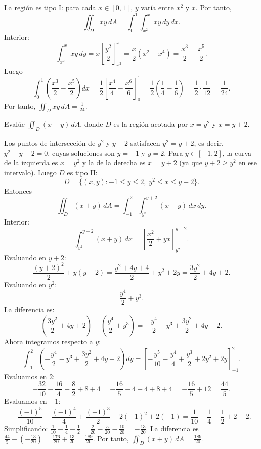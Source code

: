 \begin{myproof}
La región es tipo I: para cada $x\in[0,1]$, $y$ varía entre $x^2$ y $x$. Por tanto,
\[
\iint_D xy\,dA = \int_0^1\int_{x^2}^{x} xy\,dy\,dx.
\]
Interior:
\[
\int_{x^2}^{x} xy\,dy = x\left[\frac{y^2}{2}\right]_{x^2}^{x}
= \frac{x}{2}(x^2-x^4) = \frac{x^3}{2}-\frac{x^5}{2}.
\]
Luego
\[
\int_0^1 \left(\frac{x^3}{2}-\frac{x^5}{2}\right)dx
= \frac{1}{2}\left[\frac{x^4}{4}-\frac{x^6}{6}\right]_0^1
= \frac{1}{2}\left(\frac{1}{4}-\frac{1}{6}\right)
= \frac{1}{2}\cdot\frac{1}{12}=\frac{1}{24}.
\]
Por tanto, $\displaystyle\iint_D xy\,dA = \frac{1}{24}$.
\end{myproof}

\begin{example}
Evalúe $\displaystyle\iint_D (x+y)\,dA$, donde $D$ es la región acotada por $x=y^2$ y $x=y+2$.
\end{example}

\begin{myproof}
Los puntos de intersección de $y^2$ y $y+2$ satisfacen $y^2=y+2$, es decir, $y^2-y-2=0$, cuyas soluciones son $y=-1$ y $y=2$. Para $y\in[-1,2]$, la curva de la izquierda es $x=y^2$ y la de la derecha es $x=y+2$ (ya que $y+2\ge y^2$ en ese intervalo). Luego $D$ es tipo II:
\[
D=\{(x,y): -1\le y\le 2,\; y^2\le x\le y+2\}.
\]
Entonces
\[
\iint_D (x+y)\,dA = \int_{-1}^{2}\int_{y^2}^{y+2} (x+y)\,dx\,dy.
\]
Interior:
\[
\int_{y^2}^{y+2} (x+y)\,dx
= \left[\frac{x^2}{2}+yx\right]_{y^2}^{y+2}.
\]
Evaluando en $y+2$:
\[
\frac{(y+2)^2}{2}+y(y+2) = \frac{y^2+4y+4}{2}+y^2+2y
= \frac{3y^2}{2}+4y+2.
\]
Evaluando en $y^2$:
\[
\frac{y^4}{2}+y^3.
\]
La diferencia es:
\[
\left(\frac{3y^2}{2}+4y+2\right) - \left(\frac{y^4}{2}+y^3\right)
= -\frac{y^4}{2} - y^3 + \frac{3y^2}{2}+4y+2.
\]
Ahora integramos respecto a $y$:
\[
\int_{-1}^{2}\left(-\frac{y^4}{2} - y^3 + \frac{3y^2}{2}+4y+2\right)dy
= \left[-\frac{y^5}{10} - \frac{y^4}{4} + \frac{y^3}{2} + 2y^2 + 2y\right]_{-1}^{2}.
\]
Evaluamos en $2$:
\[
-\frac{32}{10} - \frac{16}{4} + \frac{8}{2} + 8 + 4
= -\frac{16}{5} - 4 + 4 + 8 + 4 = -\frac{16}{5} + 12 = \frac{44}{5}.
\]
Evaluamos en $-1$:
\[
-\frac{(-1)^5}{10} - \frac{(-1)^4}{4} + \frac{(-1)^3}{2} + 2(-1)^2 + 2(-1)
= \frac{1}{10} - \frac{1}{4} - \frac{1}{2} + 2 - 2.
\]
Simplificando: $\frac{1}{10} - \frac{1}{4} - \frac{1}{2} = \frac{2}{20} - \frac{5}{20} - \frac{10}{20} = -\frac{13}{20}$.
La diferencia es $\frac{44}{5} - \left(-\frac{13}{20}\right) = \frac{176}{20}+\frac{13}{20} = \frac{189}{20}$.
Por tanto, $\displaystyle\iint_D (x+y)\,dA = \frac{189}{20}$.
\end{myproof}

